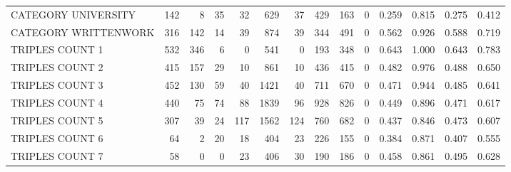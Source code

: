 \begin{tabular}{lrrrrrrrrrllll}
 CATEGORY UNIVERSITY      &             142 &             8 &              35 &              32 &             629 &   37 &  429 &  163 &    0 & 0.259 & 0.815 & 0.275 & 0.412 \\
 CATEGORY WRITTENWORK     &             316 &           142 &              14 &              39 &             874 &   39 &  344 &  491 &    0 & 0.562 & 0.926 & 0.588 & 0.719 \\
 TRIPLES COUNT 1          &             532 &           346 &               6 &               0 &             541 &    0 &  193 &  348 &    0 & 0.643 & 1.000 & 0.643 & 0.783 \\
 TRIPLES COUNT 2          &             415 &           157 &              29 &              10 &             861 &   10 &  436 &  415 &    0 & 0.482 & 0.976 & 0.488 & 0.650 \\
 TRIPLES COUNT 3          &             452 &           130 &              59 &              40 &            1421 &   40 &  711 &  670 &    0 & 0.471 & 0.944 & 0.485 & 0.641 \\
 TRIPLES COUNT 4          &             440 &            75 &              74 &              88 &            1839 &   96 &  928 &  826 &    0 & 0.449 & 0.896 & 0.471 & 0.617 \\
 TRIPLES COUNT 5          &             307 &            39 &              24 &             117 &            1562 &  124 &  760 &  682 &    0 & 0.437 & 0.846 & 0.473 & 0.607 \\
 TRIPLES COUNT 6          &              64 &             2 &              20 &              18 &             404 &   23 &  226 &  155 &    0 & 0.384 & 0.871 & 0.407 & 0.555 \\
 TRIPLES COUNT 7          &              58 &             0 &               0 &              23 &             406 &   30 &  190 &  186 &    0 & 0.458 & 0.861 & 0.495 & 0.628 \\
\hline
\end{tabular}